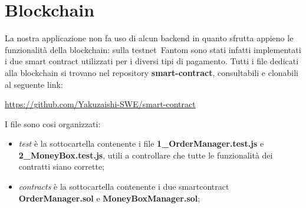 \section{Blockchain}\label{section:blockchain}

La nostra applicazione non fa uso di alcun backend in quanto sfrutta appieno le funzionalità della blockchain: 
sulla testnet\glo\ Fantom sono stati infatti implementati i due smart contract utilizzati per i diversi tipi di pagamento.
Tutti i file dedicati alla blockchain si trovano nel repository \textbf{smart-contract}, consultabili e clonabili al seguente link:

\begin{center}
    \href{https://github.com/Yakuzaishi-SWE/smart-contract}{https://github.com/Yakuzaishi-SWE/smart-contract}
\end{center}

I file sono cosi organizzati:
\begin{itemize}
    \item \textit{test} è la sottocartella contenente i file \textbf{1\_OrderManager.test.js} e \textbf{2\_MoneyBox.test.js}, utili a controllare che tutte le funzionalità dei contratti siano corrette;
    \item \textit{contracts} è la sottocartella contenente i due smartcontract \textbf{OrderManager.sol} e \textbf{MoneyBoxManager.sol};
\end{itemize}

